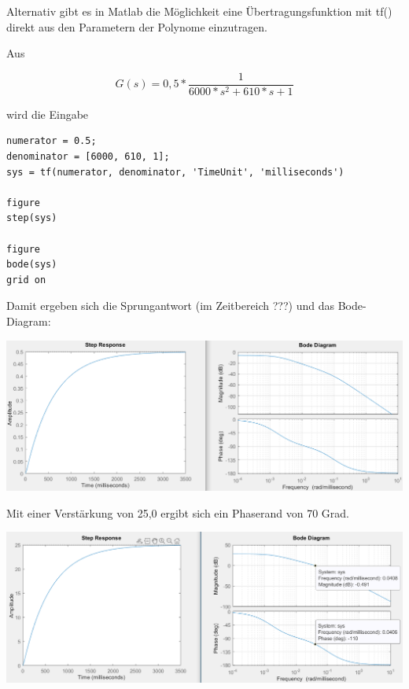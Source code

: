 \documentclass[            %
draft = false,             		%
paper = A4,                		%
pagesize = pdftex,         		%
fontsize = 10pt,           		%
DIV=15,                    		%
twoside = false,           		%
twocolumn = false,         		%
parskip = full,           		%
chapterprefix = false,      		%
appendixprefix = true,     		%
headinclude = false,       		%
footinclude = false,       		%
mpinclude = false,         		%
numbers = auto,            		%
cleardoublepage = plain,   		%
footnotes = multiple,      		%
titlepage = true,          		%
headings = normal,         		%
open = right,              		%
bibliography = openstyle,  		%
listof = chaptergapline,   		%
overfullrule = true,
]{scrbook}
\begin{document}
Alternativ gibt es in Matlab die Möglichkeit eine Übertragungsfunktion mit tf() direkt aus den Parametern der Polynome einzutragen.

Aus 

\begin{equation}
G(s) = 0,5*\frac{1}{6000*s^2 + 610*s + 1}
\end{equation}

wird die Eingabe

\begin{lstlisting}[style=CStyle]
%numerator = 25.0;
numerator = 0.5;
denominator = [6000, 610, 1];
sys = tf(numerator, denominator, 'TimeUnit', 'milliseconds')

figure
step(sys)

figure
bode(sys)
grid on
\end{lstlisting}

Damit ergeben sich die Sprungantwort (im Zeitbereich ???) und das Bode-Diagram:

\begin{center}
   \begin{minipage}[b]{1.0\textwidth}
      \includegraphics[scale=0.6]{Bilder/StepFunctionBode_Alternative.PNG}
      \label{fig:StepFunctionBode_Alternative} 
   \end{minipage}
\end{center}

Mit einer Verstärkung von 25,0 ergibt sich ein Phaserand von 70 Grad.

\begin{center}
   \begin{minipage}[b]{1.0\textwidth}
      \includegraphics[scale=0.6]{Bilder/StepFunctionBode_Alternative_70Phasenrand.PNG}
      \label{fig:StepFunctionBode_Alternative_70Phasenrand} 
   \end{minipage}
\end{center}
\end{document}
